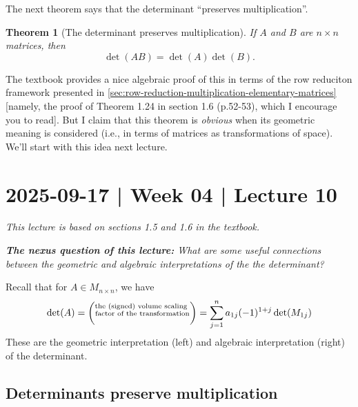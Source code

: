 \documentclass[10pt]{article}
\newtheorem{theorem}{Theorem}
\theoremstyle{definition}
\begin{document}
The next theorem says that the determinant ``preserves multiplication''.

\begin{theorem}[The determinant preserves multiplication]
  If $A$ and $B$ are $n\times n$ matrices, then
  \begin{equation*}
    \det(AB) = \det(A)\det(B).
  \end{equation*}
\end{theorem}



The textbook provides a nice algebraic proof of this in terms of the row
reduciton framework presented in
\cref{sec:row-reduction-multiplication-elementary-matrices} [namely, the proof
of Theorem 1.24 in section 1.6 (p.52-53), which I encourage you to read]. But
I claim that this theorem is \textit{obvious} when its geometric meaning is
considered (i.e., in terms of matrices as transformations of space). We'll
start with this idea next lecture.

\newpage
\section{2025-09-17 | Week 04 | Lecture 10}
\textit{This lecture is based on sections 1.5 and 1.6 in the textbook.}
\begin{center}
  \begin{tcolorbox}[width=0.9\textwidth, colback=white, colframe=black]
    \textit{\textbf{The nexus question of this lecture:} What are some useful
      connections between the geometric and algebraic interpretations of the
      the determinant?}
  \end{tcolorbox}
\end{center}

Recall that for $A\in M_{n\times n}$, we have
\begin{equation*}
  \det(A) 
  = \left( \overset{\text{the (signed) volume scaling }}{{\scriptsize \text{factor of the transformation}}} \right) 
  = \sum_{j=1}^{n} a_{1j}(-1)^{1+j}\det(M_{1j}) 
\end{equation*}
These are the geometric interpretation (left) and algebraic interpretation
(right) of the determinant. 

\subsection{Determinants preserve multiplication}
\end{document}
